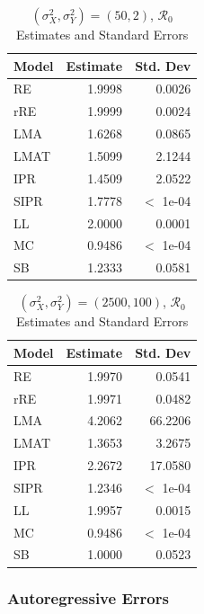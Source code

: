 \documentclass[12pt]{article}
\newcommand{\rr}{\ensuremath{\mathcal{R}_0}}
\begin{document}
\begin{table}[H]
	
	
	\centering
	\begin{tabular}[t]{l|r|r}
		\hline
		Model & Estimate & Std. Dev\\
		\hline
		RE & 1.9998 & 0.0026\\
		\hline
		rRE & 1.9999 & 0.0024\\
		\hline
		LMA & 1.6268 & 0.0865\\
		\hline
		LMAT & 1.5099 & 2.1244\\
		\hline
		IPR & 1.4509 & 2.0522\\
		\hline
		SIPR & 1.7778 & $<$ 1e-04\\
		\hline
		LL & 2.0000 & 0.0001\\
		\hline
		MC & 0.9486 & $<$ 1e-04\\
		\hline
		SB & 1.2333 & 0.0581\\
		\hline
	\end{tabular}
	\caption{ $(\sigma^2_X, \sigma^2_Y) = (50, 2)$, $\rr$ Estimates and Standard Errors}
\end{table}

\begin{table}[H]
	
	
	\centering
	\begin{tabular}[t]{l|r|r}
		\hline
		Model & Estimate & Std. Dev\\
		\hline
		RE & 1.9970 & 0.0541\\
		\hline
		rRE & 1.9971 & 0.0482\\
		\hline
		LMA & 4.2062 & 66.2206\\
		\hline
		LMAT & 1.3653 & 3.2675\\
		\hline
		IPR & 2.2672 & 17.0580\\
		\hline
		SIPR & 1.2346 & $<$ 1e-04\\
		\hline
		LL & 1.9957 & 0.0015\\
		\hline
		MC & 0.9486 & $<$ 1e-04\\
		\hline
		SB & 1.0000 & 0.0523\\
		\hline
	\end{tabular}
	\caption{$(\sigma^2_X, \sigma^2_Y) = (2500, 100)$, $\rr$ Estimates and Standard Errors}
\end{table}

\subsubsection{Autoregressive Errors}
\end{document}

